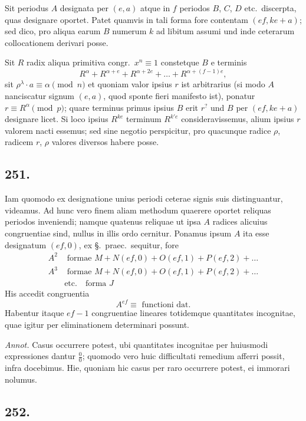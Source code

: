 \documentclass[12pt,a4paper]{article}
\newcommand{\Sec}{\S}
\begin{document}
Sit periodus $A$ designata per $(e,a)$ atque in $f$ periodos $B$, $C$, $D$ etc.~discerpta, quas designare oportet. Patet quamvis in tali forma fore contentam $(ef,ke+a)$; sed dico, pro aliqua earum $B$ numerum $k$ ad libitum assumi und inde ceterarum collocationem derivari posse.

Sit $R$ radix aliqua primitiva congr.~$x^n\equiv 1$ constetque $B$ e terminis
\[
R^\alpha + R^{\alpha+e} + R^{\alpha+2e} + \ldots + R^{\alpha+(f-1)e},
\]
sit $\rho^\lambda\cdot a \equiv \alpha\pmod{n}$ et quoniam valor ipsius $r$ ist arbitrarius (si modo $A$ nanciscatur signum $(e,a)$, quod sponte fieri manifesto ist), ponatur $r\equiv R^\alpha\pmod{p}$; quare terminus primus ipsius $B$ erit $r^?$ und $B$ per $(ef,ke+a)$ designare licet. Si loco ipsius $R^{ke}$ terminum $R^{k'e}$ consideravissemus, alium ipsius $r$ valorem nacti essemus; sed sine negotio perspicitur, pro quacunque radice $\rho$, radicem $r$, $\rho$ valores diversos habere posse.

\subsection*{251.}

Iam quomodo ex designatione unius periodi ceterae signis suis distinguantur, videamus. Ad hunc vero finem aliam methodum quaerere oportet reliquas periodos inveniendi; namque quatenus reliquae ut ipsa $A$ radices alicuius congruentiae sind, nullus in illis ordo cernitur. Ponamus ipsum $A$ ita esse designatum $(ef,0)$, ex \Sec.~praec.~sequitur, fore
\[
\begin{aligned}
A^2 &\text{ formae } M + N(ef,0) + O(ef,1) + P(ef,2) + \ldots\\
A^3 &\text{ formae } M + N(ef,0) + O(ef,1) + P(ef,2) + \ldots\\
& \text{etc.} \quad \text{forma } J
\end{aligned}
\]
His accedit congruentia
\[
A^{ef} \equiv \text{ functioni dat}.
\]
Habentur itaque $ef-1$ congruentiae lineares totidemque quantitates incognitae, quae igitur per eliminationem determinari possunt.

\textit{Annot.} Casus occurrere potest, ubi quantitates incognitae per huiusmodi expressiones dantur $\frac{0}{0}$; quomodo vero huic difficultati remedium afferri possit, infra docebimus. Hie, quoniam hic casus per raro occurrere potest, ei immorari nolumus.

\subsection*{252.}
\end{document}
